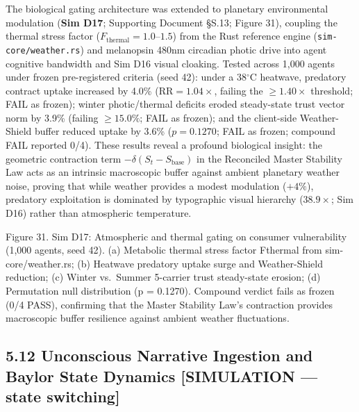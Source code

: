 \documentclass[
]{article}
\begin{document}
The biological gating architecture was extended to planetary
environmental modulation (\textbf{Sim D17}; Supporting Document §S.13;
Figure 31), coupling the thermal stress factor
(\(F_{\text{thermal}} = 1.0\text{--}1.5\)) from the Rust reference
engine (\texttt{sim-core/weather.rs}) and melanopsin 480nm circadian
photic drive into agent cognitive bandwidth and Sim D16 visual cloaking.
Tested across 1,000 agents under frozen pre-registered criteria (seed
42): under a 38\(^\circ\)C heatwave, predatory contract uptake increased
by 4.0\% (\(\text{RR} = 1.04\times\), failing the \(\ge 1.40\times\)
threshold; FAIL as frozen); winter photic/thermal deficits eroded
steady-state trust vector norm by 3.9\% (failing \(\ge 15.0\%\); FAIL as
frozen); and the client-side Weather-Shield buffer reduced uptake by
3.6\% (\(p = 0.1270\); FAIL as frozen; compound FAIL reported 0/4).
These results reveal a profound biological insight: the geometric
contraction term \(-\delta(S_t - S_{\text{base}})\) in the Reconciled
Master Stability Law acts as an intrinsic macroscopic buffer against
ambient planetary weather noise, proving that while weather provides a
modest modulation (\(+4\%\)), predatory exploitation is dominated by
typographic visual hierarchy (\(38.9\times\); Sim D16) rather than
atmospheric temperature.

Figure 31. Sim D17: Atmospheric and thermal gating on consumer
vulnerability (1,000 agents, seed 42). (a) Metabolic thermal stress
factor {Fthermal} from sim-core/weather.rs; (b) Heatwave predatory
uptake surge and Weather-Shield reduction; (c) Winter vs.~Summer
5-carrier trust steady-state erosion; (d) Permutation null distribution
({p = 0.1270}). Compound verdict fails as frozen (0/4 PASS), confirming
that the Master Stability Law's contraction provides macroscopic buffer
resilience against ambient weather fluctuations.

\subsection{5.12 Unconscious Narrative Ingestion and Baylor State
Dynamics {[}SIMULATION --- state
switching{]}}\label{unconscious-narrative-ingestion-and-baylor-state-dynamics-simulation-state-switching}
\end{document}
